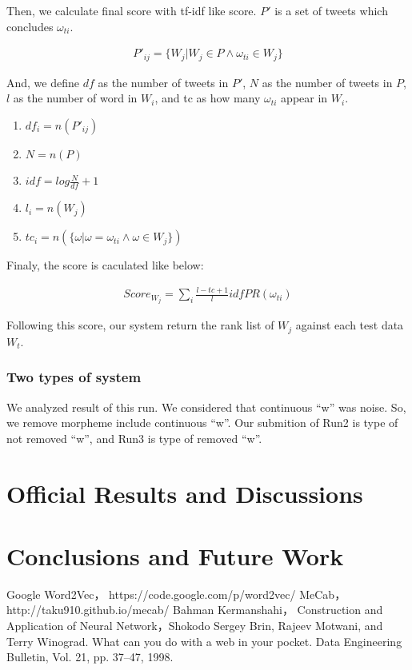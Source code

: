 \documentclass{../style/sig-alternate}
\begin{document}
Then, we calculate final score with tf-idf like score. $P'$ is a set of tweets which concludes $\omega_{ti}$. 

\begin{eqnarray}P'_{ij} = \{W_{j} | W_{j} \in P \wedge \omega_{ti} \in W_{j}\}\end{eqnarray}

And, we define $df$ as the number of tweets in $P'$, $N$ as the number of tweets in $P$, $l$ as the number of word in $W_{i}$, and tc as how many $\omega_{ti}$ appear in $W_{i}$.

\begin{enumerate}
    \item $df_{i} = n(P'_{ij})$
    \item $N = n(P)$
    \item $idf = log \frac{N}{df} + 1$
    \item $l_{i} = n(W_{j})$
    \item $tc_{i} = n(\{\omega | \omega = \omega_{ti} \wedge \omega \in W_{j}\})$
\end{enumerate}

Finaly, the score is caculated like below:

\begin{eqnarray}Score_{W_{j}} = \sum_{i} \frac{l-tc+1}{l} idf PR(\omega_{ti})\end{eqnarray}

Following this score, our system return the rank list of $W_{j}$ against each test data $W_{t}$.

\subsubsection{Two types of system}
  We analyzed result of this run. We considered that continuous ``w'' was noise. So, we remove morpheme include continuous ``w''.
  Our submition of Run2 is type of not removed ``w'', and Run3 is type of removed ``w''.



\section{Official Results and Discussions}
\label{sec:results}

\section{Conclusions and Future Work}
\label{sec:conclusions}

\begin{thebibliography}{99}

 Google Word2Vec， https://code.google.com/p/word2vec/
 MeCab， http://taku910.github.io/mecab/
 Bahman Kermanshahi， Construction and Application of Neural Network，Shokodo
 Sergey Brin, Rajeev Motwani, and Terry Winograd. What can you do with a
web in your pocket. Data Engineering Bulletin, Vol. 21, pp. 37–47, 1998.

\end{thebibliography}
\end{document}
